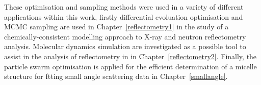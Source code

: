 These optimisation and sampling methods were used in a variety of different applications within this work, firstly differential evoluation optimisation and MCMC sampling are used in Chapter~\ref{reflectometry1} in the study of a chemically-consistent modelling approach to X-ray and neutron reflectometry analysis.
Molecular dynamics simulation are investigated as a possible tool to assist in the analysis of reflectometry in in Chapter~\ref{reflectometry2}.
Finally, the particle swarm optimisation is applied for the efficient determination of a micelle structure for ftting small angle scattering data in Chapter~\ref{smallangle}.

